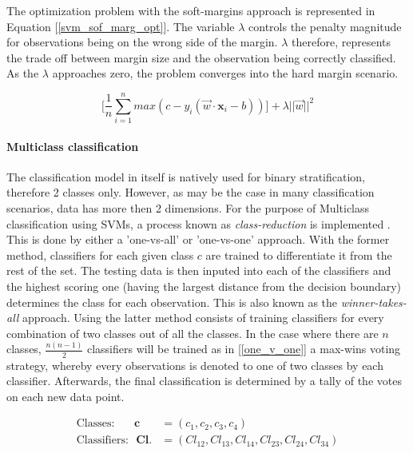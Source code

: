 	The optimization problem with the soft-margins approach is represented in Equation [\ref{svm_sof_marg_opt}]. The variable $\lambda$ controls the penalty magnitude for observations being on the wrong side of the margin. $\lambda$ therefore, represents the trade off between margin size and the observation being correctly classified. As the $\lambda$ approaches zero, the problem converges into the hard margin scenario.

	\begin{equation}
		\Bigg[
		\frac{1}{n} \sum_{i=1}^{n}max(c-y_i(\vec{w} \cdot \textbf{x}_i - b )) 
		\Bigg]
		+ \lambda || \vec{w} ||^2
		\label{svm_sof_marg_opt}
	\end{equation}

\paragraph{Multiclass classification}
	The classification model in itself is natively used for binary stratification, therefore 2 classes only. However, as may be the case in many classification scenarios, data has more then 2 dimensions. For the purpose of Multiclass classification using SVMs, a process known as \textit{class-reduction} is implemented \cite{aly2005survey}. This is done by either a 'one-vs-all' or 'one-vs-one' approach. With the former method, classifiers for each given class $c$ are trained to differentiate it from the rest of the set. The testing data is then inputed into each of the classifiers and the highest scoring one (having the largest distance from the decision boundary) determines the class for each observation. This is also known as the \textit{winner-takes-all} approach. Using the latter method consists of training classifiers for every combination of two classes out of all the classes. In the case where there are $n$ classes, $\frac{n(n-1)}{2} $ classifiers will be trained as in [\ref{one_v_one}]
	a max-wins voting strategy, whereby every observations is denoted to one of two classes by each classifier. Afterwards, the final classification is determined by a tally of the votes on each new data point.
	
	\begin{equation}
		\begin{aligned}
			\text{Classes:}	\ \ \ \ \ \ \ \	\textbf{c} &= (c_1,c_2,c_3,c_4) \\
			\text{Classifiers:}\ \ \ 	\textbf{Cl.} &= (Cl_{12},Cl_{13},Cl_{14},Cl_{23},Cl_{24},Cl_{34})
		\end{aligned}	
		\label{one_v_one}
	\end{equation}

